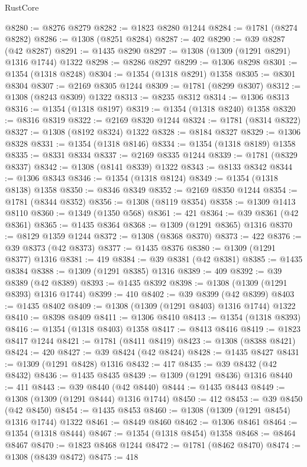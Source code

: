\begin{lexlean}{RustCore}
\begin{coremodule}
@8280 := @8276 @8279
@8282 := @1823 @8280 @1244
@8284 := @1781 (@8274 @8282)
@8286 := @1308 (@8251 @8284)
@8287 := 402
@8290 := @39 @8287 (@42 @8287)
@8291 := @1435 @8290
@8297 := @1308 (@1309 (@1291 @8291) @1316 @1744) @1322
@8298 := @8286 @8297
@8299 := @1306 @8298
@8301 := @1354 (@1318 @8248)
@8304 := @1354 (@1318 @8291) @1358
@8305 := @8301 @8304
@8307 := @2169 @8305 @1244
@8309 := @1781 (@8299 @8307)
@8312 := @1308 (@8243 @8309) @1322
@8313 := @8235 @8312
@8314 := @1306 @8313
@8316 := @1354 (@1318 @8197)
@8319 := @1354 (@1318 @8240) @1358
@8320 := @8316 @8319
@8322 := @2169 @8320 @1244
@8324 := @1781 (@8314 @8322)
@8327 := @1308 (@8192 @8324) @1322
@8328 := @8184 @8327
@8329 := @1306 @8328
@8331 := @1354 (@1318 @8146)
@8334 := @1354 (@1318 @8189) @1358
@8335 := @8331 @8334
@8337 := @2169 @8335 @1244
@8339 := @1781 (@8329 @8337)
@8342 := @1308 (@8141 @8339) @1322
@8343 := @8133 @8342
@8344 := @1306 @8343
@8346 := @1354 (@1318 @8124)
@8349 := @1354 (@1318 @8138) @1358
@8350 := @8346 @8349
@8352 := @2169 @8350 @1244
@8354 := @1781 (@8344 @8352)
@8356 := @1308 (@8119 @8354)
@8358 := @1309 @1413 @8110
@8360 := @1349 (@1350 @568)
@8361 := 421
@8364 := @39 @8361 (@42 @8361)
@8365 := @1435 @8364
@8368 := @1309 (@1291 @8365) @1316
@8370 := @8129 @1359 @1244
@8372 := @1308 (@8368 @8370)
@8373 := 422
@8376 := @39 @8373 (@42 @8373)
@8377 := @1435 @8376
@8380 := @1309 (@1291 @8377) @1316
@8381 := 419
@8384 := @39 @8381 (@42 @8381)
@8385 := @1435 @8384
@8388 := @1309 (@1291 @8385) @1316
@8389 := 409
@8392 := @39 @8389 (@42 @8389)
@8393 := @1435 @8392
@8398 := @1308 (@1309 (@1291 @8393) @1316 @1744)
@8399 := 410
@8402 := @39 @8399 (@42 @8399)
@8403 := @1435 @8402
@8409 := @1308 (@1309 (@1291 @8403) @1316 @1744) @1322
@8410 := @8398 @8409
@8411 := @1306 @8410
@8413 := @1354 (@1318 @8393)
@8416 := @1354 (@1318 @8403) @1358
@8417 := @8413 @8416
@8419 := @1823 @8417 @1244
@8421 := @1781 (@8411 @8419)
@8423 := @1308 (@8388 @8421)
@8424 := 420
@8427 := @39 @8424 (@42 @8424)
@8428 := @1435 @8427
@8431 := @1309 (@1291 @8428) @1316
@8432 := 417
@8435 := @39 @8432 (@42 @8432)
@8436 := @1435 @8435
@8439 := @1309 (@1291 @8436) @1316
@8440 := 411
@8443 := @39 @8440 (@42 @8440)
@8444 := @1435 @8443
@8449 := @1308 (@1309 (@1291 @8444) @1316 @1744)
@8450 := 412
@8453 := @39 @8450 (@42 @8450)
@8454 := @1435 @8453
@8460 := @1308 (@1309 (@1291 @8454) @1316 @1744) @1322
@8461 := @8449 @8460
@8462 := @1306 @8461
@8464 := @1354 (@1318 @8444)
@8467 := @1354 (@1318 @8454) @1358
@8468 := @8464 @8467
@8470 := @1823 @8468 @1244
@8472 := @1781 (@8462 @8470)
@8474 := @1308 (@8439 @8472)
@8475 := 418

\end{coremodule}
\end{lexlean}
